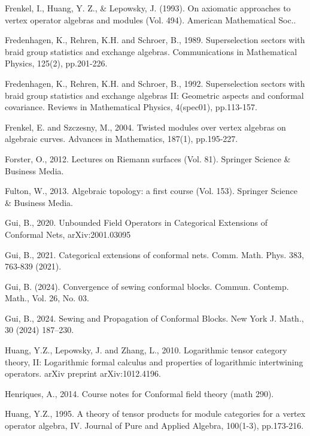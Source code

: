 \documentclass[11pt,b5paper,notitlepage]{article}
\theoremstyle{definition}
\theoremstyle{plain}
\numberwithin{equation}{subsection}
\begin{document}
\begin{thebibliography}{999999}
Frenkel, I., Huang, Y. Z., \& Lepowsky, J. (1993). On axiomatic approaches to vertex operator algebras and modules (Vol. 494). American Mathematical Soc..


Fredenhagen, K., Rehren, K.H. and Schroer, B., 1989. Superselection sectors with braid group statistics and exchange algebras. Communications in Mathematical Physics, 125(2), pp.201-226.

Fredenhagen, K., Rehren, K.H. and Schroer, B., 1992. Superselection sectors with braid group statistics and exchange algebras II: Geometric aspects and conformal covariance. Reviews in Mathematical Physics, 4(spec01), pp.113-157.

Frenkel, E. and Szczesny, M., 2004. Twisted modules over vertex algebras on algebraic curves. Advances in Mathematics, 187(1), pp.195-227.

	


Forster, O., 2012. Lectures on Riemann surfaces (Vol. 81). Springer Science \& Business Media.

Fulton, W., 2013. Algebraic topology: a first course (Vol. 153). Springer Science \& Business Media.


Gui, B., 2020. Unbounded Field Operators in Categorical Extensions of Conformal Nets,  arXiv:2001.03095


Gui, B., 2021. Categorical extensions of conformal nets. Comm. Math. Phys. 383, 763-839 (2021).



Gui, B. (2024). Convergence of sewing conformal blocks. Commun. Contemp. Math., Vol. 26, No. 03.

Gui, B., 2024. Sewing and Propagation of Conformal Blocks. New York J. Math., 30 (2024) 187–230.

Huang, Y.Z., Lepowsky, J. and Zhang, L., 2010. Logarithmic tensor category theory, II: Logarithmic formal calculus and properties of logarithmic intertwining operators. arXiv preprint arXiv:1012.4196.

Henriques, A., 2014. Course notes for Conformal field theory (math 290).


Huang, Y.Z., 1995. A theory of tensor products for module categories for a vertex operator algebra, IV. Journal of Pure and Applied Algebra, 100(1-3), pp.173-216.


\end{thebibliography}
\end{document}
